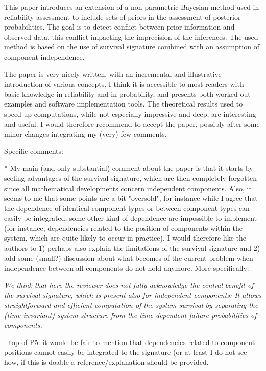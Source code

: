 \documentclass[12pt, a4paper]{elsarticle}
\begin{document}
This paper introduces an extension of a non-parametric Bayesian method used in reliability assessment to include sets of priors in the assessment of posterior probabilities. The goal is to detect conflict between prior information and observed data, this conflict impacting the imprecision of the inferences. The used method is based on the use of survival signature combined with an assumption of component independence.

The paper is very nicely written, with an incremental and illustrative introduction of various concepts. I think it is accessible to most readers with basic knowledge in reliability and in probability, and presents both worked out examples and software implementation tools. The theoretical results used to speed up computations, while not especially impressive and deep, are interesting and useful. I would therefore recommend to accept the paper, possibly after some minor changes integrating my (very) few comments.

Specific comments:

* My main (and only substantial) comment about the paper is that it starts by seeling advantages of the survival signature, which are then completely forgotten since all mathematical developments concern independent components. Also, it seems to me that some points are a bit "oversold", for instance while I agree that the dependence of identical component types or between component types can easily be integrated, some other kind of dependence are impossible to implement (for instance, dependencies related to the position of components within the system, which are quite likely to occur in practice). I would therefore like the authors to 1) perhaps also explain the limitations of the survival signature and 2) add some (small?) discussion about what becomes of the current problem when independence between all components do not hold anymore. More specifically:

\medskip
\emph{We think that here the reviewer does not fully acknowledge the central benefit of the survival signature,
which is present also for independent components:
It allows straightforward and efficient computation of the system survival by separating the (time-invariant) system structure from the time-dependent failure probabilities of components.}
\medskip

- top of P5: it would be fair to mention that dependencies related to component positions cannot easily be integrated to the signature (or at least I do not see how, if this is doable a reference/explanation should be provided.
\end{document}
